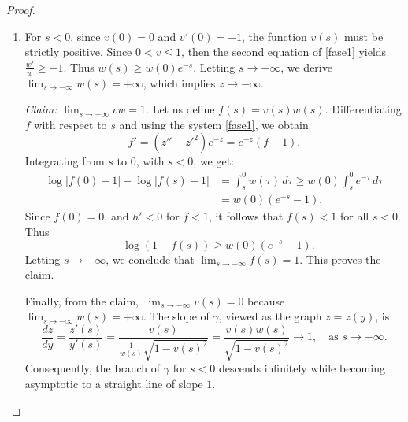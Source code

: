 \documentclass[a4paper,12pt]{amsart}
\theoremstyle{plain}
\theoremstyle{definition}
\begin{document}
\begin{proof}
\begin{enumerate}
\item For $s < 0$, since $v(0)=0$ and $v'(0)=-1$, the function $v(s)$ must be strictly positive. Since $0<v\leq 1$, then the second equation of \eqref{fase1} yields $\frac{w'}{w}\geq -1$. Thus $w(s)\geq w(0)e^{-s}$. Letting $s\to-\infty$, we derive $\lim_{s\to-\infty}w(s)=+\infty$, which implies $z \to -\infty$. 

{\it Claim:} $\lim_{s \to -\infty} vw = 1$. Let us define $f(s) = v(s)w(s)$. Differentiating $f$ with respect to $s$ and using the system \eqref{fase1}, we obtain
$$f'=(z''-z'^2)e^{-z}=e^{-z}(f-1).$$
 Integrating from $s$ to $0$, with $s < 0$, we get:
\begin{equation*}
\begin{split}
 \log|f(0) - 1| - \log|f(s) - 1| &= \int_{s}^{0} w(\tau) \, d\tau \geq w(0) \int_{s}^{0} e^{-\tau} \, d\tau\\
 &=w(0)(e^{-s}-1).
 \end{split}
 \end{equation*}
Since $f(0) = 0$, and $h'<0$ for $f<1$, it follows that $f(s) < 1$ for all $s < 0$. Thus
$$ -\log(1 - f(s)) \geq w(0)(e^{-s}-1).$$
Letting $s\to-\infty$, we conclude that $\lim_{s \to -\infty} f(s) = 1$. This proves the claim. 

Finally, from the claim, $\lim_{s\to -\infty}v(s) = 0$ because $\lim_{s\to-\infty}w(s)=+\infty$. The slope of $\gamma$, viewed as the graph $z=z(y)$, is
$$ \frac{dz}{dy} = \frac{z'(s)}{y'(s)} = \frac{v(s)}{ \frac{1}{w(s)} \sqrt{1-v(s)^2}} = \frac{v(s)w(s)}{\sqrt{1-v(s)^2}} \to 1,\quad\mbox{as $s\to-\infty$}.$$
Consequently, the branch of $\gamma$ for $s<0$ descends infinitely while becoming asymptotic to a straight line of slope $1$.
 
\end{enumerate}
\end{proof}
 
\end{document}
